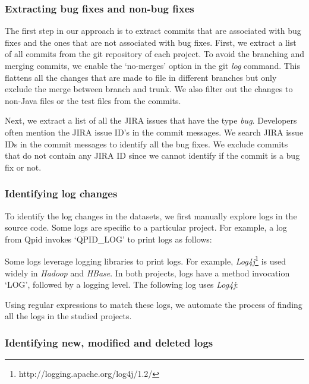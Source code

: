 \subsubsection{Extracting bug fixes and non-bug fixes}

The first step in our approach is to extract commits that are associated with bug fixes and the ones that are not associated with bug fixes. First, we extract a list of all commits from the git repository of each project. To avoid the branching and merging commits, we enable the `no-merges' option in the git \textsl{log} command. This flattens all the changes that are made to file in different branches but only exclude the merge between branch and trunk. We also filter out the changes to non-Java files or the test files from the commits. 

Next, we extract a list of all the JIRA issues that have the type \emph{bug}. Developers often mention the JIRA issue ID's in the commit messages. We search JIRA issue IDs in the commit messages to identify all the bug fixes. We exclude commits that do not contain any JIRA ID since we cannot identify if the commit is a bug fix or not. 

\subsubsection{Identifying log changes}

To identify the log changes in the datasets, we first manually explore logs in the source code. Some logs are specific to a particular project. For example, a log from Qpid invokes `QPID\_LOG' to print logs as follows: 

Some logs leverage logging libraries to print logs. For example, \textsl{Log4j}\footnote{http://logging.apache.org/log4j/1.2/} is used widely in \emph{Hadoop} and \emph{HBase}. In both projects, logs have a method invocation `LOG', followed by a logging level. The following log uses \textsl{Log4j}:

Using regular expressions to match these logs, we automate the process of finding all the logs in the studied projects.


\subsubsection{Identifying new, modified and deleted logs}


